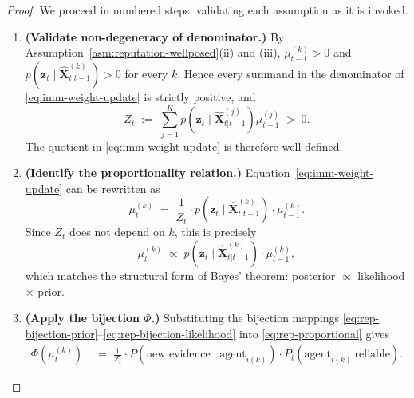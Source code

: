 \documentclass[12pt,openany]{book}
\numberwithin{equation}{chapter}
\theoremstyle{plain}
\theoremstyle{definition}
\theoremstyle{remark}
\begin{document}
\begin{proof}
We proceed in numbered steps, validating each assumption as it is
invoked.

\begin{enumerate}

  \item \textbf{(Validate non-degeneracy of denominator.)}
        By Assumption~\ref{asm:reputation-wellposed}(ii) and (iii),
        $\mu_{t-1}^{(k)} > 0$ and
        $p(\mathbf{z}_t \mid \hat{\mathbf{X}}_{t|t-1}^{(k)}) > 0$
        for every $k$.  Hence every summand in the denominator of
        \eqref{eq:imm-weight-update} is strictly positive, and
        \begin{equation}
          Z_t \;:=\; \sum_{j=1}^{K}
          p\!\left(\mathbf{z}_t \mid
            \hat{\mathbf{X}}_{t|t-1}^{(j)}\right)
          \mu_{t-1}^{(j)}
          \;>\; 0.
          \label{eq:rep-denom}
        \end{equation}
        The quotient in \eqref{eq:imm-weight-update} is therefore
        well-defined.

  \item \textbf{(Identify the proportionality relation.)}
        Equation~\eqref{eq:imm-weight-update} can be rewritten as
        \begin{equation}
          \mu_t^{(k)}
          \;=\;
          \frac{1}{Z_t}
          \cdot
          p\!\left(\mathbf{z}_t \mid
            \hat{\mathbf{X}}_{t|t-1}^{(k)}\right)
          \cdot
          \mu_{t-1}^{(k)}.
          \label{eq:rep-proportional}
        \end{equation}
        Since $Z_t$ does not depend on $k$, this is precisely
        \begin{equation}
          \mu_t^{(k)}
          \;\propto\;
          p\!\left(\mathbf{z}_t \mid
            \hat{\mathbf{X}}_{t|t-1}^{(k)}\right)
          \cdot
          \mu_{t-1}^{(k)},
          \label{eq:rep-prop-compact}
        \end{equation}
        which matches the structural form of Bayes' theorem:
        posterior $\propto$ likelihood $\times$ prior.

  \item \textbf{(Apply the bijection $\Phi$.)}
        Substituting the bijection mappings
        \eqref{eq:rep-bijection-prior}--\eqref{eq:rep-bijection-likelihood}
        into \eqref{eq:rep-proportional} gives
        \begin{align}
          \Phi\!\left(\mu_t^{(k)}\right)
          &\;=\;
          \frac{1}{Z_t}
          \cdot
          P\!\left(\text{new evidence} \mid
            \text{agent}_{i(k)}\right)
          \cdot
          P_t\!\left(\text{agent}_{i(k)}\ \text{reliable}\right).
          \label{eq:rep-bijected}
        \end{align}


\end{enumerate}
\end{proof}
\end{document}
